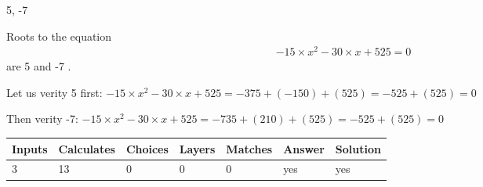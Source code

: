 \documentclass[12pt]{article}
\begin{document}
5,  %
-7
 
 
 
\noindent{}
 
 

 
 
 
\noindent{}
 
 

Roots to the equation
\begin{eqnarray*}
-15 \times x^2  %
-30
                 \times x    %
+  %
525 =0
\end{eqnarray*}
are  %
5 and  %
-7 .
 
Let us verity  %
5 first:
$  %
-15 \times x^2  %
-30
                 \times x    %
+  %
525
  = %
-375+( %
-150)+( %
525)
  = %
-525+( %
525)
  = %
0
$
 
Then verity  %
-7:
$  %
-15 \times x^2  %
-30
                 \times x    %
+  %
525
  = %
-735+( %
210)+( %
525)
  = %
-525+( %
525)
  = %
0
$
 
 
 
\noindent{}
 
 

 
\vspace{0.3in}
   
   
   
   
\noindent\begin{tabular}{|l|l|l|l|l|l|l|}
 \hline
Inputs & Calculates & Choices & Layers & Matches & Answer & Solution \\ \hline
           3 & 
          13 & 
           0
  & 
           0 & 
           0 & 
  yes & 
  yes 
  \\ \hline
 \end{tabular}
   
   
   
   
\noindent{}
   
   
  
\end{document}
